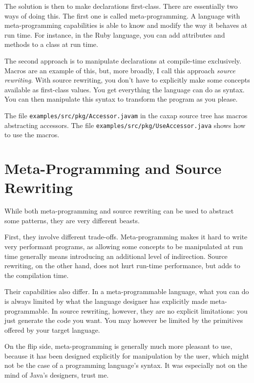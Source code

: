 The solution is then to make declarations first-class. There are essentially two
ways of doing this. The first one is called meta-programming. A language with
meta-programming capabilities is able to know and modify the way it behaves at
run time. For instance, in the Ruby language, you can add attributes and methods
to a class at run time.

The second approach is to manipulate declarations at compile-time
exclusively. Macros are an example of this, but, more broadly, I call this
approach \emph{source rewriting}. With source rewriting, you don't have to
explicitly make some concepts available as first-class values. You get
everything the language can do as syntax. You can then manipulate this syntax to
transform the program as you please.

The file \texttt{examples/src/pkg/Accessor.javam} in the caxap source tree has
macros abstracting accessors. The file
\texttt{examples/src/pkg/UseAccessor.java} shows how to use the macros.

\section{Meta-Programming and Source Rewriting}

While both meta-programming and source rewriting can be used to abstract some
patterns, they are very different beasts.

First, they involve different trade-offs. Meta-programming makes it hard to
write very performant programs, as allowing some concepts to be manipulated at
run time generally means introducing an additional level of indirection. Source
rewriting, on the other hand, does not hurt run-time performance, but adds to
the compilation time.

Their capabilities also differ. In a meta-programmable language, what you can do
is always limited by what the language designer has explicitly made
meta-programmable. In source rewriting, however, they are no explicit
limitations: you just generate the code you want. You may however be limited by
the primitives offered by your target language.

On the flip side, meta-programming is generally much more pleasant to use,
because it has been designed explicitly for manipulation by the user, which
might not be the case of a programming language's syntax. It was especially not
on the mind of Java's designers, trust me.

